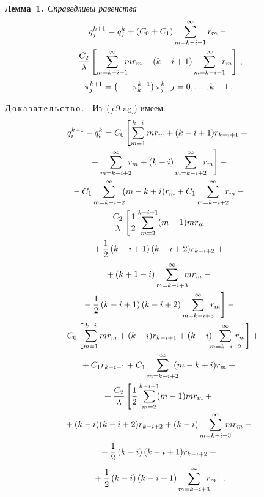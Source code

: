 \begin{multicols}{2}
  \noindent
  \textbf{Лемма~1.}\  \textit{Справедливы равенства}
  \begin{multline}
  q_j^{k+1} =q_j^k +\left(C_0+C_1\right) \sum\limits_{m=k-i+1}^\infty r_m -{}\\
\hspace*{-3mm}{}- \fr{C_2}{\lambda} \left[ \sum\limits_{m=k-i+1}^\infty \hspace*{-2mm}mr_m - (k-i+1) 
\sum\limits_{m=k-i+1}^\infty\hspace*{-2mm} r_m \right]\,;
  \label{e12-ag}
  \end{multline}
  \begin{equation}
  \pi_j^{k+1} =  \left( 1-\pi_k^{k+1}\right) \pi_j^k\,\enskip j=0,\ldots, k-1\,.
  \label{e13-ag}
  \end{equation}
  
  \noindent
  Д\,о\,к\,а\,з\,а\,т\,е\,л\,ь\,с\,т\,в\,о\,.\ \ Из~(\ref{e9-ag}) имеем:
  \begin{multline*}
  q_i^{k+1} -q_i^k= C_0\left[
  \sum\limits_{m=1}^{k-i} mr_m +(k-i+1) r_{k-i+1}+{}\right.\\
\left.  {}+ \sum\limits^\infty_{m=k-i+2}\hspace*{-2mm} r_m +(k-i) \sum\limits^\infty_{m=k-i+2}
\hspace*{-2mm} r_m\right] -{}\\
{}-C_1
\sum\limits^\infty_{m=k-i+2}\hspace*{-1mm} (m-k+i) r_m+ 
C_1 \sum\limits^\infty_{m=k-i+2} \hspace*{-2mm} r_m -{}\\
{}-\fr{C_2}{\lambda}
\left[
\fr{1}{2}\sum\limits_{m=2}^{k-i+1} (m-1)mr_m+{}\right.\\
\left.{}+\fr{1}{2}\left( k-i+1\right)
(k-i+2) r_{k-i+2}+{}\right.\\
{}+(k+1-i) \sum\limits^\infty_{m=k-i+3}\hspace*{-2mm} mr_m-{}\\
\left.{}-
\fr{1}{2}\left( k-i+1\right) (k-i+2) 
\sum\limits^\infty_{m=k-i+3}\hspace*{-2mm} r_m\right]-{}\\
{}-C_0\left[ \sum\limits_{m=1}^{k-i} mr_m+(k-i) r_{k-i+1} +(k-i)\!\hspace*{-2.9pt} \sum\limits^\infty_{m=k-i+2}
\hspace*{-3mm} r_m\right]+{}\\
{}+C_1 r_{k-i+1} +C_1\sum\limits^\infty_{m=k-i+2}\hspace*{-2mm} (m-k+i)r_m+{}\\
{}+ \fr{C_2}{\lambda} \left[ \fr{1}{2} \sum\limits_{m=2}^{k-i+1}\hspace*{-1mm}
(m-1)mr_m +{}\right.\\
{}+(k-i) (k-i+2)r_{k-i+2}+
(k-i) \sum\limits^\infty_{m=k-i+3}\hspace*{-3mm} mr_m -{}\\
{}-\fr{1}{2}\left(k-i\right)
(k-i+1) r_{k-i+2}+{}\\
\left.{}+\fr{1}{2}\left( k-i\right) (k-i+1) \sum\limits^\infty_{m=k-i+3}\hspace*{-2mm} r_m\right].
\end{multline*}
    

\end{multicols}
